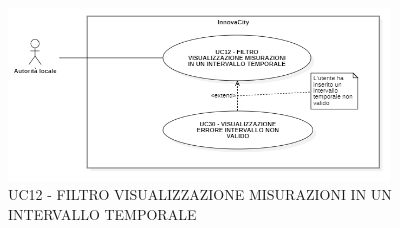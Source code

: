 


\begin{figure}[H]
    \centering
    \includegraphics[width=0.9\textwidth]{../Images/uc12.PNG}
    \caption{UC12 - FILTRO VISUALIZZAZIONE MISURAZIONI IN UN INTERVALLO TEMPORALE}
\end{figure}



